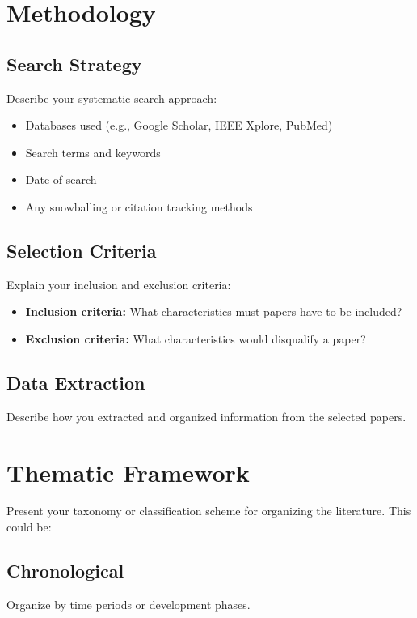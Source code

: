 \documentclass[11pt,a4paper]{article}
\begin{document}
\section{Methodology}
\label{sec:method}

\subsection{Search Strategy}
Describe your systematic search approach:
\begin{itemize}
    \item Databases used (e.g., Google Scholar, IEEE Xplore, PubMed)
    \item Search terms and keywords
    \item Date of search
    \item Any snowballing or citation tracking methods
\end{itemize}

\subsection{Selection Criteria}
Explain your inclusion and exclusion criteria:
\begin{itemize}
    \item \textbf{Inclusion criteria:} What characteristics must papers have to be included?
    \item \textbf{Exclusion criteria:} What characteristics would disqualify a paper?
\end{itemize}

\subsection{Data Extraction}
Describe how you extracted and organized information from the selected papers.

\section{Thematic Framework}
\label{sec:framework}

Present your taxonomy or classification scheme for organizing the literature. This could be:

\subsection{Chronological}
Organize by time periods or development phases.
\end{document}
